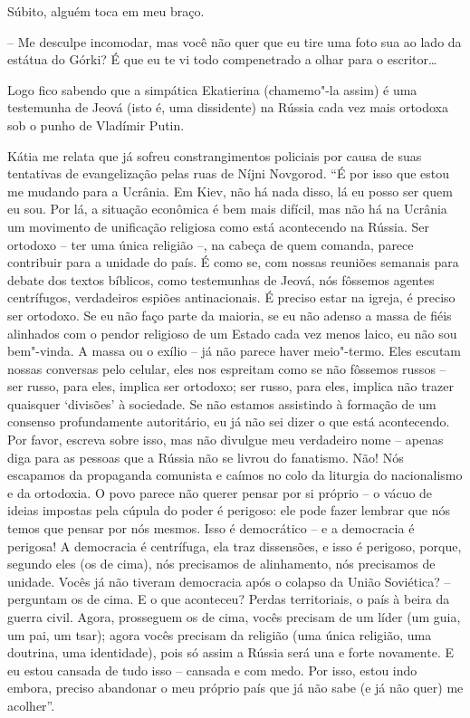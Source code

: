 Súbito, alguém toca em meu braço.

-- Me desculpe incomodar, mas você não quer que eu tire uma foto sua ao
lado da estátua do Górki? É que eu te vi todo compenetrado a olhar para
o escritor\ldots{}

Logo fico sabendo que a simpática Ekatierina (chamemo"-la assim) é uma
testemunha de Jeová (isto é, uma dissidente) na Rússia cada vez mais
ortodoxa sob o punho de Vladímir Putin.

Kátia me relata que já sofreu constrangimentos policiais por causa de
suas tentativas de evangelização pelas ruas de Níjni Novgorod. ``É por
isso que estou me mudando para a Ucrânia. Em Kiev, não há nada disso, lá
eu posso ser quem eu sou. Por lá, a situação econômica é bem mais
difícil, mas não há na Ucrânia um movimento de unificação religiosa como
está acontecendo na Rússia. Ser ortodoxo -- ter uma única religião --,
na cabeça de quem comanda, parece contribuir para a unidade do país. É
como se, com nossas reuniões semanais para debate dos textos bíblicos,
como testemunhas de Jeová, nós fôssemos agentes centrífugos, verdadeiros
espiões antinacionais. É preciso estar na igreja, é preciso ser
ortodoxo. Se eu não faço parte da maioria, se eu não adenso a massa de
fiéis alinhados com o pendor religioso de um Estado cada vez menos
laico, eu não sou bem"-vinda. A massa ou o exílio -- já não parece haver
meio"-termo. Eles escutam nossas conversas pelo celular, eles nos
espreitam como se não fôssemos russos -- ser russo, para eles, implica
ser ortodoxo; ser russo, para eles, implica não trazer quaisquer
`divisões' à sociedade. Se não estamos assistindo à formação de um
consenso profundamente autoritário, eu já não sei dizer o que está
acontecendo. Por favor, escreva sobre isso, mas não divulgue meu
verdadeiro nome -- apenas diga para as pessoas que a Rússia não se
livrou do fanatismo. Não! Nós escapamos da propaganda comunista e caímos
no colo da liturgia do nacionalismo e da ortodoxia. O povo parece não
querer pensar por si próprio -- o vácuo de ideias impostas pela cúpula
do poder é perigoso: ele pode fazer lembrar que nós temos que pensar por
nós mesmos. Isso é democrático -- e a democracia é perigosa! A
democracia é centrífuga, ela traz dissensões, e isso é perigoso, porque,
segundo eles (os de cima), nós precisamos de alinhamento, nós precisamos
de unidade. Vocês já não tiveram democracia após o colapso da União
Soviética? -- perguntam os de cima. E o que aconteceu? Perdas
territoriais, o país à beira da guerra civil. Agora, prosseguem os de
cima, vocês precisam de um líder (um guia, um pai, um tsar); agora vocês
precisam da religião (uma única religião, uma doutrina, uma identidade),
pois só assim a Rússia será una e forte novamente. E eu estou cansada de
tudo isso -- cansada e com medo. Por isso, estou indo embora, preciso
abandonar o meu próprio país que já não sabe (e já não quer) me
acolher''.


